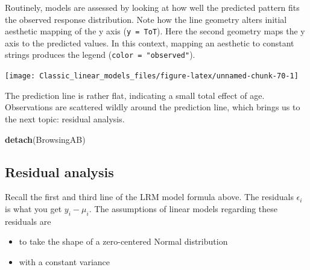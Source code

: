 \documentclass[]{svmono}
\newenvironment{Shaded}{\begin{snugshade}}{\end{snugshade}}
\newcommand{\KeywordTok}[1]{\textcolor[rgb]{0.13,0.29,0.53}{\textbf{#1}}}
\newcommand{\DataTypeTok}[1]{\textcolor[rgb]{0.13,0.29,0.53}{#1}}
\newcommand{\StringTok}[1]{\textcolor[rgb]{0.31,0.60,0.02}{#1}}
\newcommand{\OperatorTok}[1]{\textcolor[rgb]{0.81,0.36,0.00}{\textbf{#1}}}
\newcommand{\NormalTok}[1]{#1}
\providecommand{\tightlist}{%
  \setlength{\itemsep}{0pt}\setlength{\parskip}{0pt}}
\begin{document}
Routinely, models are assessed by looking at how well the predicted
pattern fits the observed response distribution. Note how the line
geometry alters initial aesthetic mapping of the y axis
(\texttt{y\ =\ ToT}). Here the second geometry maps the y axis to the
predicted values. In this context, mapping an aesthetic to constant
strings produces the legend (\texttt{color\ =\ "observed"}).

\begin{Shaded}
\end{Shaded}

\texttt{[image: Classic\_linear\_models\_files/figure-latex/unnamed-chunk-70-1]}

The prediction line is rather flat, indicating a small total effect of
age. Observations are scattered wildly around the prediction line, which
brings us to the next topic: residual analysis.

\begin{Shaded}
\begin{Highlighting}[]
\KeywordTok{detach}\NormalTok{(BrowsingAB)}
\end{Highlighting}
\end{Shaded}

\subsection{Residual analysis}\label{residual-analysis}

Recall the first and third line of the LRM model formula above. The
residuals \(\epsilon_i\) is what you get \(y_i - \mu_i\). The
assumptions of linear models regarding these residuals are

\begin{itemize}
\tightlist
\item
  to take the shape of a zero-centered Normal distribution
\item
  with a constant variance
\end{itemize}
\end{document}

